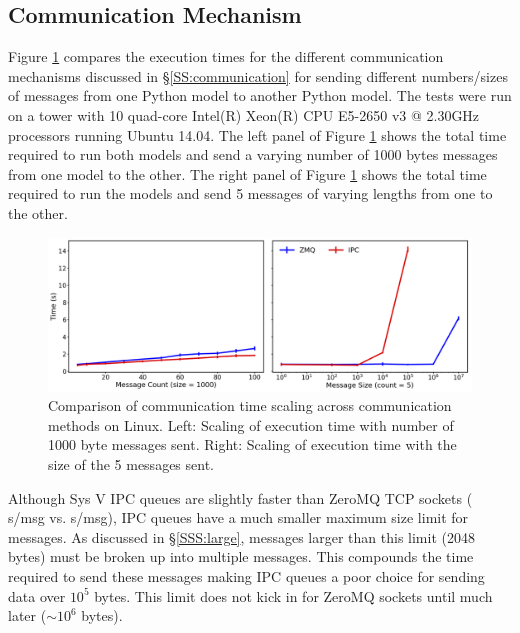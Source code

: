 \documentclass[journal]{IEEEtran}
\newcommand{\todo}[1]{{\color{red}{#1}}}
\begin{document}
\subsection{Communication Mechanism}
%
Figure \ref{fig:commtype} compares the execution times for the different communication mechanisms discussed in \S\ref{SS:communication} for sending different numbers/sizes of messages from one Python model to another Python model. The tests were run on a \todo{Dell?} tower with 10 quad-core Intel(R) Xeon(R) CPU E5-2650 v3 @ 2.30GHz processors running Ubuntu 14.04. The left panel of Figure \ref{fig:commtype} shows the total time required to run both models and send a varying number of 1000 bytes messages from one model to the other. The right panel of Figure \ref{fig:commtype} shows the total time required to run the models and send 5 messages of varying lengths from one to the other.
%
\ifinclfig
 	\begin{figure}[htbp]
	\begin{center}
	\includegraphics[width=\columnwidth,keepaspectratio]{./images/scaling_commtype.png}
	\caption{Comparison of communication time scaling across communication methods on Linux. Left: Scaling of execution time with number of 1000 byte messages sent. Right: Scaling of execution time with the size of the 5 messages sent.}
	\label{fig:commtype}
	\end{center}
	\end{figure}
\fi
%
Although Sys V IPC queues are slightly faster than ZeroMQ TCP sockets (\todo{0.012} s/msg vs. \todo{0.019} s/msg), IPC queues have a much smaller maximum size limit for messages. As discussed in \S\ref{SSS:large}, messages larger than this limit (2048 bytes) must be broken up into multiple messages. This compounds the time required to send these messages making IPC queues a poor choice for sending data over $10^5$ bytes. This limit does not kick in for ZeroMQ sockets until much later ($\sim10^6$ bytes).

\end{document}
